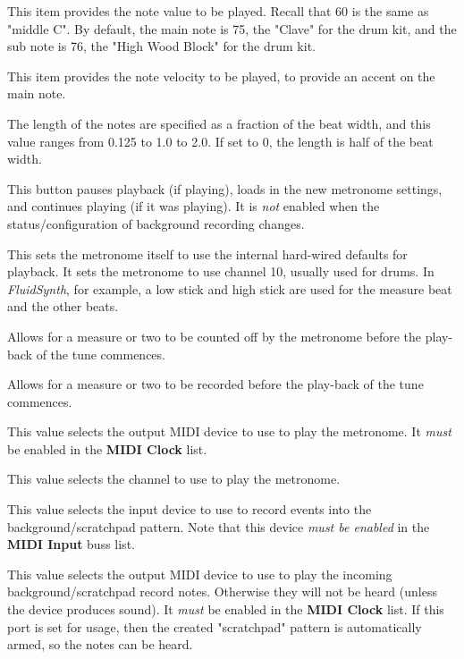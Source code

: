    This item provides the note value to be played.  Recall that 60 is the same
   as "middle C".  By default, the main note is 75, the "Clave" for the drum
   kit, and the sub note is 76, the "High Wood Block" for the drum kit.

   This item provides the note velocity to be played, to provide an accent on
   the main note.

   The length of the notes are specified as a fraction of the beat width, and
   this value ranges from 0.125 to 1.0 to 2.0.
   If set to 0, the length is half of the beat width.

   This button pauses playback (if playing),
   loads in the new metronome settings, and
   continues playing (if it was playing).
   It is \textsl{not} enabled when the status/configuration of background
   recording changes.

   This sets the metronome itself to use the internal
   hard-wired defaults for playback.
   It sets the metronome to use channel 10, usually used
   for drums.
   In \textsl{FluidSynth}, for example, a low stick and high stick
   are used for the measure beat and the other beats.

   Allows for a measure or two to be counted off by the metronome
   before the play-back of the tune commences.

   Allows for a measure or two to be recorded
   before the play-back of the tune commences.

   This value selects the output MIDI device to use to play the metronome.
   It \textsl{must} be enabled in the \textbf{MIDI Clock} list.

   This value selects the channel to use to play the metronome.

   This value selects the input device to use to record events into the
   background/scratchpad pattern.
   Note that this device \textsl{must be enabled} in the \textbf{MIDI Input}
   buss list.

   This value selects the output MIDI device to use to play the incoming
   background/scratchpad record notes.  Otherwise they will not be heard
   (unless the device produces sound).
   It \textsl{must} be enabled in the \textbf{MIDI Clock} list.
   If this port is set for usage, then the created "scratchpad"
   pattern is automatically armed, so the notes can be heard.

